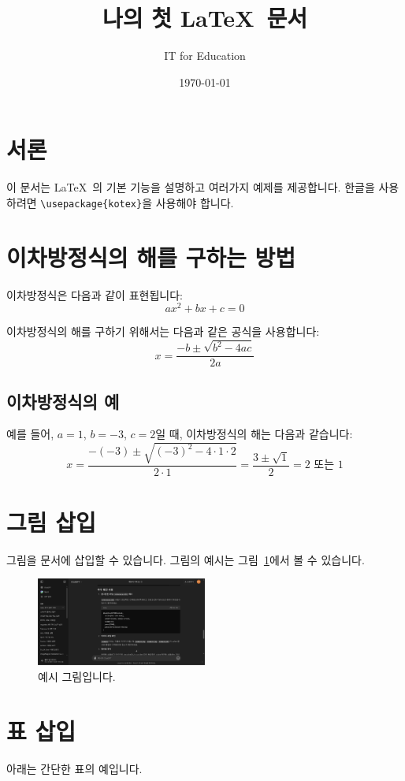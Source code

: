 \documentclass{oblivoir}
\title{나의 첫 \LaTeX\ 문서}
\author{IT for Education}
\date{\today} %
\begin{document}
 
 	\maketitle 
 	\newpage %
 	\tableofcontents %
 	\newpage %

 	\section{서론}
 	이 문서는 \LaTeX\ 의 기본 기능을 설명하고 여러가지 예제를 제공합니다. 한글을 사용하려면 \verb|\usepackage{kotex}|을 사용해야 합니다.

 	\section{이차방정식의 해를 구하는 방법}
 	이차방정식은 다음과 같이 표현됩니다:
 	$$ax^2 + bx + c = 0$$

 	이차방정식의 해를 구하기 위해서는 다음과 같은 공식을 사용합니다:
 	$$x = \frac{-b \pm \sqrt{b^2 - 4ac}}{2a}$$

 	\subsection{이차방정식의 예}
 	예를 들어, $a=1$, $b=-3$, $c=2$일 때, 이차방정식의 해는 다음과 같습니다:
 	$$x = \frac{-(-3) \pm \sqrt{(-3)^2 - 4 \cdot 1 \cdot 2}}{2 \cdot 1} = \frac{3 \pm \sqrt{1}}{2} = 2 \text{ 또는 } 1$$

 	\section{그림 삽입}
 	그림을 문서에 삽입할 수 있습니다. 그림의 예시는 그림~\ref{fig:example}에서 볼 수 있습니다.

 	\begin{figure}[h]
 		\centering
 		\includegraphics[width=0.5\textwidth]{example.png} %
 		\caption{예시 그림입니다.}
 		\label{fig:example}
 	\end{figure}

 	\section{표 삽입}
 	아래는 간단한 표의 예입니다.
\end{document}
